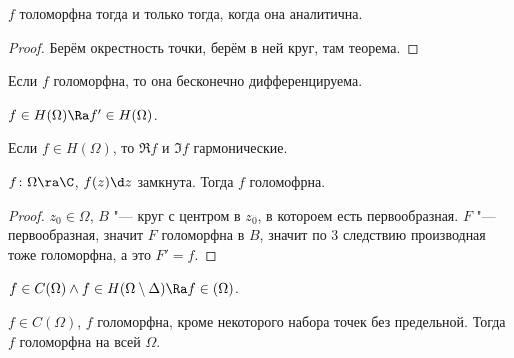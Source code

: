 \begin{conseq}
	$f$ толоморфна тогда и только тогда, когда она аналитична.
\end{conseq}
\begin{proof}
	Берём окрестность точки, берём в ней круг, там теорема.
\end{proof}

\begin{conseq}
	Если $f$ голоморфна, то она бесконечно дифференцируема.
\end{conseq}

\begin{conseq}
	$f \in H(\Omega) \Ra f' \in H(\Omega)$.
\end{conseq}

\begin{conseq}
	Если $f \in H(\Omega)$, то $\Re f$ и $\Im f$ гармонические.
\end{conseq}

\begin{theorem}[Морера]
	$f\colon \Omega \ra \C$, $f(z) \d z$ замкнута.
	Тогда $f$ голомофрна.
\end{theorem}
\begin{proof}
	$z_0 \in \Omega$, $B$ "--- круг с центром в $z_0$, в котороем есть первообразная.
	$F$ "--- первообразная, значит $F$ голоморфна в $B$, значит по 3 следствию производная тоже голоморфна, а это $F' = f$.
\end{proof}

\begin{conseq}
	$f \in C(\Omega) \land f \in H(\Omega \setminus \Delta) \Ra f \in (\Omega)$.
\end{conseq}

\begin{conseq}
	$f \in C(\Omega)$, $f$ голоморфна, кроме некоторого набора точек без предельной.
	Тогда $f$ голоморфна на всей $\Omega$.
\end{conseq}

